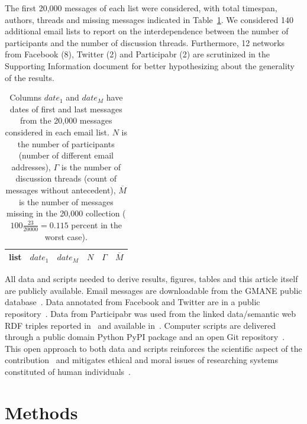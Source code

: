 \documentclass[%
	aip,
	jmp,%
	amsmath,amssymb,
	reprint,%
]{revtex4-1}
\begin{document}
The first 20,000 messages of each list were considered, with total timespan, authors, threads and missing messages indicated in Table~\ref{tab:genLists}.
We considered 140 additional email lists to
report on the interdependence between the number of participants and 
the number of discussion threads.
Furthermore, 12 networks from Facebook (8), Twitter (2) and Participabr (2)
are scrutinized in the Supporting Information document for better hypothesizing
about the generality of the results.

\begin{table}
	\centering
	\caption{Columns $date_1$ and $date_M$ have dates of first and last messages from the 20,000 messages considered in each email list.
		$N$ is the number of participants (number of different email addresses),
		$\Gamma$ is the number of discussion threads (count of messages without antecedent),
		$\overline{M}$ is the number of messages missing in the 20,000 collection
		($100\frac{23}{20000}=0.115$ percent in the worst case).
	}
	\label{tab:genLists}
	\begin{tabular}{|l|c|c|c|c|c|}\hline
		list & $date_1$ & $date_{M}$    & $N$  & $\Gamma$ & $\overline{M}$ \\\hline
		
	\end{tabular}
\end{table}

All data and scripts needed to derive results, figures, tables and this article itself
are publicly available.
Email messages are downloadable from the GMANE public database~\cite{GMANEwikipedia}.
Data annotated from Facebook and Twitter are in a public repository~\cite{fbtwData}.
Data from Participabr was used from the linked data/semantic web RDF triples
reported in~\cite{opa} and available in~\cite{datahub}.
Computer scripts are delivered through a public domain Python PyPI package and
an open Git repository~\cite{gmanePack}.
This open approach to both data and scripts
reinforces the scientific aspect of the contribution~\cite{openSci}
and mitigates ethical and moral issues of researching 
systems constituted of
human individuals~\cite{anPhy,ccs15}.

\section{Methods}\label{sec:carac}
\end{document}
